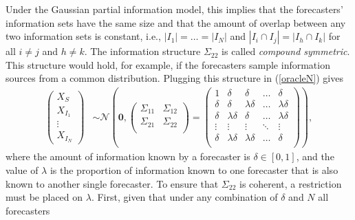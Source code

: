 \documentclass[11pt]{article}
\theoremstyle{definition}
\theoremstyle{definition}
\def\probit{p_{\rm probit}}
\begin{document}
Under the Gaussian partial information model, this implies that the forecasters' information sets have the 
same size and that the amount of overlap between any two information 
sets is constant, i.e., $|I_{1}| =  \dots = |I_{N}|$ and 
$|I_{i} \cap I_{j}| = |I_{h} \cap I_{k}|$ for all $i \neq j$ 
and $h \neq k$.   
The information structure $\Sigma_{22}$ is called \textit{compound symmetric}.  
This structure would hold, for example, if the forecasters sample information sources from a common distribution.
Plugging this structure in (\ref{oracleN}) gives
\begin{align*}
\left(\begin{matrix} X_{S} \\ X_{I_1}\\ \vdots \\ X_{I_N} 
   \end{matrix}\right) 
  &\sim \mathcal{N}\left( \boldsymbol{0}, \left(\begin{matrix} 
\Sigma_{11} & \Sigma_{12}\\
\Sigma_{21} & \Sigma_{22}\\
 \end{matrix}\right) 
 =
 \left(\begin{array}{c|cccc}
1 & \delta & \delta & \dots & \delta  \\ \hline
\delta  &\delta & \lambda\delta & \dots & \lambda\delta   \\ 
\delta & \lambda\delta & \delta & \dots & \lambda\delta  \\ 
\vdots & \vdots & \vdots & \ddots & \vdots  \\ 
\delta  & \lambda\delta & \lambda\delta & \dots & \delta\\ 
 \end{array}\right)\right),
\end{align*}
where the amount of information known by a forecaster is  $\delta \in [0,1]$, and the value of $\lambda$ is the proportion 
of information known to one forecaster that is also known to
another single forecaster.  
To ensure that $\Sigma_{22}$ is coherent, a restriction must 
be placed on $\lambda$. 
First, given that under any combination of $\delta$ and $N$ all forecasters 
\end{document}
